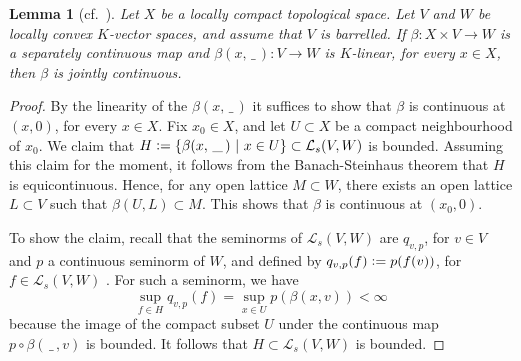 \documentclass[a4paper, reqno, 10pt]{amsart}
\newtheorem{lemma}[theorem]{Lemma}
\theoremstyle{definition}
\numberwithin{equation}{section}
\newcommand{\blank}{{\,\_\,}}
\newcommand{\defeq}{\vcentcolon=}
\newcommand{\ra}{\rightarrow}
\let\originalmiddle\middle
\renewcommand{\middle}[1]{\,\originalmiddle#1\,}
\newcommand{\CL}{{\mathcal {L}}}
\begin{document}
\begin{lemma}[{cf.\ \cite[Lemma 1.3]{SchneiderTeitelbaum02pAdicBoundVal}}]\label{Lemma A1 - Separately continuous is jointly continuous under maps by locally compact space on barrelled vector space}
Let $X$ be a locally compact topological space.
Let $V$ and $W$ be locally convex $K$-vector spaces, and assume that $V$ is barrelled.
If $\beta \colon X \times V \ra W$ is a separately continuous map and $\beta(x,\blank) \colon V \ra W$ is $K$-linear, for every $x\in X$, then $\beta$ is jointly continuous.
\end{lemma}
\begin{proof}
By the linearity of the $\beta(x,\blank)$ it suffices to show that $\beta$ is continuous at $(x,0)$, for every $x\in X$.
Fix $x_0\in X$, and let $U\subset X$ be a compact neighbourhood of $x_0$.
We claim that $H \defeq \left\{\beta(x,\blank) \middle{|} x \in U \right\} \subset \CL_s(V,W)$ is bounded.
Assuming this claim for the moment, it follows from the Banach-Steinhaus theorem \cite[Prop.\ 6.15]{Schneider02NonArchFunctAna} that $H$ is equicontinuous.
Hence, for any open lattice $M\subset W$, there exists an open lattice $L\subset V$ such that $\beta(U,L) \subset M$.
This shows that $\beta$ is continuous at $(x_0,0)$.

To show the claim, recall that the seminorms of $\CL_s(V,W)$ are $q_{v,p}$, for $v\in V$ and $p$ a continuous seminorm of $W$, and defined by $q_{v,p}(f) \defeq p(f(v))$, for $f\in \CL_s(V,W)$ \cite[Example 1 after 6.6]{Schneider02NonArchFunctAna}.
For such a seminorm, we have
\begin{equation*}
	\sup_{f \in H} q_{v,p}(f) = \sup_{x\in U} p(\beta(x,v))  < \infty
\end{equation*}
because the image of the compact subset $U$ under the continuous map $p\circ \beta(\blank,v)$ is bounded.
It follows that $H\subset \CL_s(V,W)$ is bounded.
\end{proof}
\end{document}
